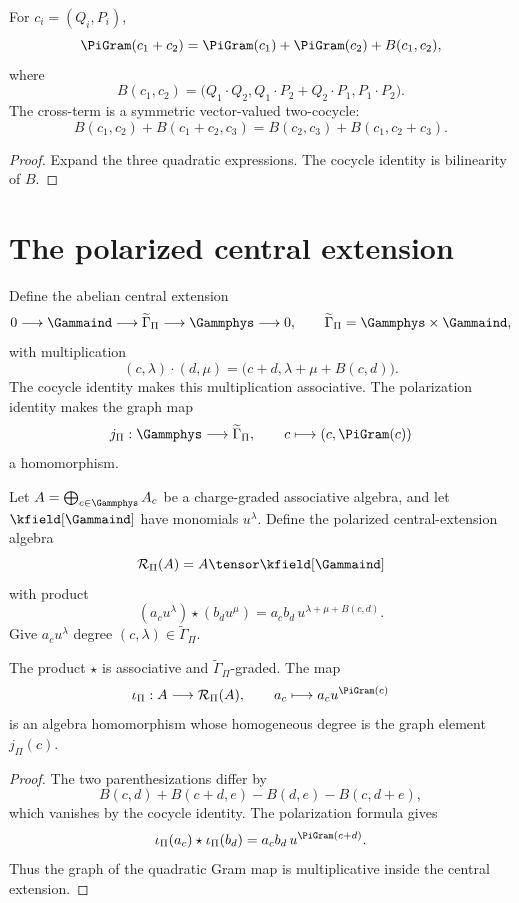 \begin{proposition}
For $c_i=(Q_i,P_i)$,
\[
 \PiGram(c_1+c_2)=\PiGram(c_1)+\PiGram(c_2)+B(c_1,c_2),
\]
where
\[
 B(c_1,c_2)=
 \bigl(Q_1\cdot Q_2,
 Q_1\cdot P_2+Q_2\cdot P_1,
 P_1\cdot P_2\bigr).
\]
The cross-term is a symmetric vector-valued two-cocycle:
\[
 B(c_1,c_2)+B(c_1+c_2,c_3)
 =B(c_2,c_3)+B(c_1,c_2+c_3).
\]
\end{proposition}
\begin{proof}
Expand the three quadratic expressions. The cocycle identity is bilinearity of $B$.
\end{proof}

\section{The polarized central extension}
Define the abelian central extension
\[
 0\longrightarrow\Gammaind\longrightarrow
 \widetilde\Gamma_\Pi
 \longrightarrow\Gammphys\longrightarrow0,
 \qquad
 \widetilde\Gamma_\Pi=\Gammphys\times\Gammaind,
\]
with multiplication
\[
 (c,\lambda)\cdot(d,\mu)
 =\bigl(c+d,\lambda+\mu+B(c,d)\bigr).
\]
The cocycle identity makes this multiplication associative. The polarization identity makes the graph map
\[
 j_\Pi:\Gammphys\longrightarrow\widetilde\Gamma_\Pi,
 \qquad c\longmapsto(c,\PiGram(c))
\]
a homomorphism.

Let $A=\bigoplus_{c\in\Gammphys}A_c$ be a charge-graded associative algebra, and let $\kfield[\Gammaind]$ have monomials $u^\lambda$. Define the polarized central-extension algebra
\[
 \mathcal R_\Pi(A)=A\tensor\kfield[\Gammaind]
\]
with product
\[
 (a_cu^\lambda)\star(b_du^\mu)
 =a_cb_d\,u^{\lambda+\mu+B(c,d)}.
\]
Give $a_cu^\lambda$ degree $(c,\lambda)\in\widetilde\Gamma_\Pi$.

\begin{theorem}
The product $\star$ is associative and $\widetilde\Gamma_\Pi$-graded. The map
\[
 \iota_\Pi:A\longrightarrow\mathcal R_\Pi(A),
 \qquad a_c\longmapsto a_cu^{\PiGram(c)}
\]
is an algebra homomorphism whose homogeneous degree is the graph element $j_\Pi(c)$.
\end{theorem}
\begin{proof}
The two parenthesizations differ by
\[
 B(c,d)+B(c+d,e)-B(d,e)-B(c,d+e),
\]
which vanishes by the cocycle identity. The polarization formula gives
\[
 \iota_\Pi(a_c)\star\iota_\Pi(b_d)
 =a_cb_d\,u^{\PiGram(c+d)}.
\]
Thus the graph of the quadratic Gram map is multiplicative inside the central extension.
\end{proof}

